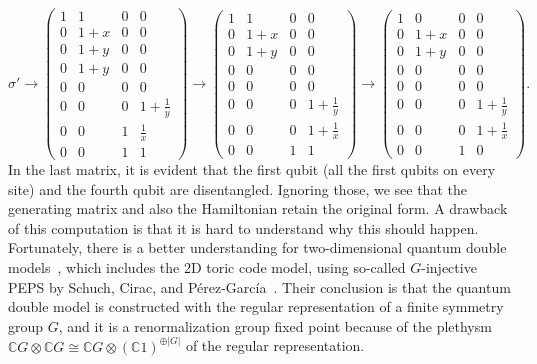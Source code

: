 \[
 \sigma' \to
\left(
\begin{array}{cccc}
 1 & 1 & 0 & 0 \\
 0 & 1+x & 0 & 0 \\
 0 & 1+y & 0 & 0 \\
 0 & 1+y & 0 & 0 \\
\hline
\hline
 0 & 0 & 0 & 0 \\
 0 & 0 & 0 & 1+\frac{1}{y} \\
 0 & 0 & 1 & \frac{1}{x} \\
 0 & 0 & 1 & 1
\end{array}
\right)
\to
\left(
\begin{array}{cccc}
 1 & 1 & 0 & 0 \\
 0 & 1+x & 0 & 0 \\
 0 & 1+y & 0 & 0 \\
 0 & 0 & 0 & 0 \\
\hline
\hline
 0 & 0 & 0 & 0 \\
 0 & 0 & 0 & 1+\frac{1}{y} \\
 0 & 0 & 0 & 1+\frac{1}{x} \\
 0 & 0 & 1 & 1
\end{array}
\right)
\to
\left(
\begin{array}{c|c|c|c}
 1 & 0 & 0 & 0 \\
\hline
 0 & 1+x & 0 & 0 \\
 0 & 1+y & 0 & 0 \\
\hline
 0 & 0 & 0 & 0 \\
\hline
\hline
 0 & 0 & 0 & 0 \\
\hline
 0 & 0 & 0 & 1+\frac{1}{y} \\
 0 & 0 & 0 & 1+\frac{1}{x} \\
\hline
 0 & 0 & 1 & 0
\end{array}
\right).
\]
In the last matrix, it is evident that the first qubit (all the first qubits on every site)
and the fourth qubit are disentangled.
Ignoring those, we see that the generating matrix and also the Hamiltonian retain the original form.
A drawback of this computation is that it is hard to understand why this should happen.
Fortunately, there is a better understanding for two-dimensional quantum double models~\cite{Kitaev2003Fault-tolerant},
which includes the 2D toric code model,
using so-called $G$-injective PEPS by Schuch, Cirac, and P\'erez-Garc\'ia~\cite{SchuchCiracPerez-Garcia2010G-injective}.
Their conclusion is that
the quantum double model is constructed with the regular representation of a finite symmetry group $G$,
and it is a renormalization group fixed point
because of the plethysm $\mathbb{C}G \otimes \mathbb{C}G \cong \mathbb{C}G \otimes (\mathbb{C}1)^{\oplus |G|}$ 
of the regular representation.

